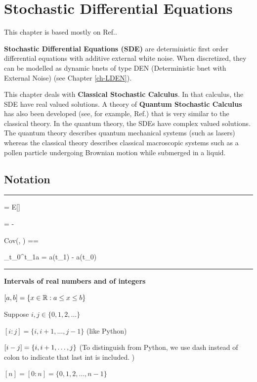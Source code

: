 \chapter{Stochastic Differential Equations}
\label{ch-stochastic-diff-eqns}

This chapter is based mostly on Ref.\cite{sar-sol}.

{\bf Stochastic Differential Equations (SDE)}
are deterministic first order differential equations with additive external white noise. When discretized, they 
can be modelled as dynamic bnets of type
DEN (Deterministic bnet with External Noise) (see Chapter \ref{ch-LDEN}).

This chapter deals with {\bf Classical Stochastic Calculus}. In that calculus,
the SDE have real valued solutions.
A theory of {\bf Quantum Stochastic Calculus} has also been developed (see,
for example,  Ref.\cite{part-quantum-sde}) that is
very similar to the classical
theory. In the quantum theory, the SDEs  have complex valued solutions. The quantum theory describes quantum 
mechanical systems (such as lasers) 
whereas the classical theory describes classical macroscopic systems such as a
pollen particle undergoing Brownian motion
while submerged in a liquid.


\section{Notation}

\hrule{}

\beq 
\av{\rva} = E[\rva]
\eeq

\beq
\Delta \rva = \rva - \av{\rva}
\eeq

\beq
Cov(\rva, \rvb) =\av{\rva, \rvb}=
\av{\Delta\rva \Delta\rvb}
\eeq

\beq
\Delta_{t_0}^{t_1}a = a(t_1) - a(t_0)
\eeq

\hrule \noindent
{\bf Intervals of real numbers and of integers}

$[a, b]=\{ x\in { \mathbb{R}}: a\leq x \leq b\}$

Suppose $i, j\in \{0, 1,2, \ldots\}$

$[i:j] =\{i, i+1, \ldots, j-1\}$  (like Python)

$[i - j] = \{i, i+1, \ldots, j\}$ (To distinguish from Python,
we use dash instead of colon 
to indicate that last int is included.
)




$[n]=[0:n]=\{0, 1, 2, \ldots, n-1\}$


